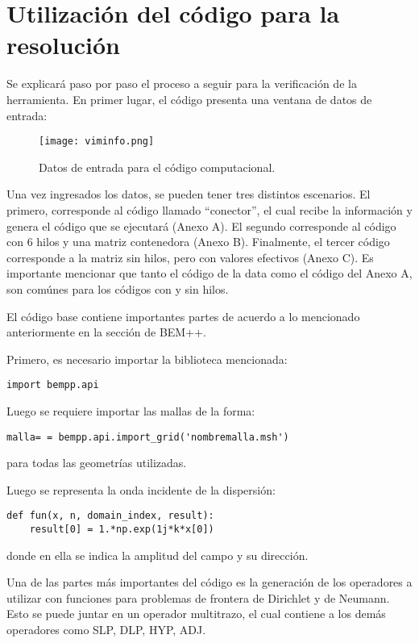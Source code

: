 \documentclass[12pt,letterpaper]{report}
\numberwithin{equation}{section}
\begin{document}
\section{Utilización del código para la resolución}

Se explicará paso por paso el proceso a seguir para la verificación de la herramienta. En primer lugar, el código presenta una ventana de datos de entrada:

\begin{figure}[H]
	\centering\texttt{[image: viminfo.png]}\\
	\caption{Datos de entrada para el código computacional.}
	\label{fig:viminfo}
\end{figure} 

Una vez ingresados los datos, se pueden tener tres distintos escenarios. El primero, corresponde al código llamado ``conector'', el cual recibe la información y genera el código que se ejecutará (Anexo A). El segundo corresponde al código con 6 hilos y una matriz contenedora (Anexo B). Finalmente, el tercer código corresponde a la matriz sin hilos, pero con valores efectivos (Anexo C). Es importante mencionar que tanto el código de la data como el código del Anexo A, son comúnes para los códigos con y sin hilos.

El código base contiene importantes partes de acuerdo a lo mencionado anteriormente en la sección de BEM++.

Primero, es necesario importar la biblioteca mencionada:

\begin{lstlisting}
import bempp.api
\end{lstlisting}
Luego se requiere importar las mallas de la forma:
\begin{lstlisting}
malla= = bempp.api.import_grid('nombremalla.msh')
\end{lstlisting}

\noindent para todas las geometrías utilizadas.

Luego se representa la onda incidente de la dispersión:

\begin{lstlisting}
def fun(x, n, domain_index, result):
	result[0] = 1.*np.exp(1j*k*x[0])
\end{lstlisting}

\noindent donde en ella se indica la amplitud del campo y su dirección.


Una de las partes más importantes del código es la generación de los operadores a utilizar con funciones para problemas de frontera de Dirichlet y de Neumann. Esto se puede juntar en un operador multitrazo, el cual contiene a los demás operadores como SLP, DLP, HYP, ADJ.
\end{document}
